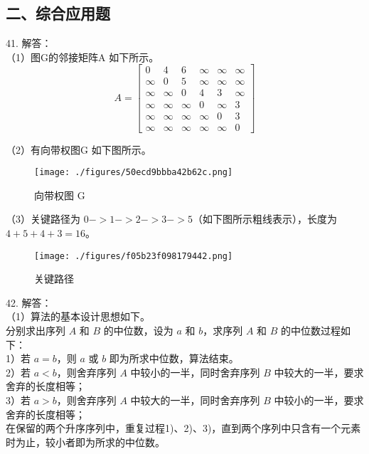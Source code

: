\subsection{二、综合应用题}

41. 解答： \\
（1）图G的邻接矩阵A 如下所示。 \\
\begin{equation}
A=
\begin{bmatrix}
 0 & 4 & 6 & \infty & \infty & \infty \\
 \infty & 0 & 5 & \infty & \infty & \infty \\
 \infty & \infty & 0 & 4 & 3 & \infty \\
 \infty & \infty & \infty & 0 & \infty & 3 \\
 \infty & \infty & \infty & \infty & 0 & 3 \\
 \infty & \infty & \infty & \infty & \infty & 0 
\end{bmatrix}
\end{equation}


（2）有向带权图G 如下图所示。 \\
\begin{figure}[ht]
\centering
\texttt{[image: ./figures/50ecd9bbba42b62c.png]}
\caption{向带权图 G} \label{fig_Na11_2}
\end{figure}

（3）关键路径为 $0->1->2->3->5$（如下图所示粗线表示），长度为 $4+5+4+3=16$。 \\
\begin{figure}[ht]
\centering
\texttt{[image: ./figures/f05b23f098179442.png]}
\caption{关键路径} \label{fig_Na11_3}
\end{figure}

42. 解答： \\
（1）算法的基本设计思想如下。 \\
分别求出序列 $A$ 和 $B$ 的中位数，设为 $a$ 和 $b$，求序列 $A$ 和 $B$ 的中位数过程如下： \\
1）若 $a=b$，则 $a$ 或 $b$ 即为所求中位数，算法结束。 \\
2）若 $a<b$，则舍弃序列 $A$ 中较小的一半，同时舍弃序列 $B$ 中较大的一半，要求舍弃的长度相等； \\
3）若 $a>b$，则舍弃序列 $A$ 中较大的一半，同时舍弃序列 $B$ 中较小的一半，要求舍弃的长度相等； \\
在保留的两个升序序列中，重复过程1)、2)、3)，直到两个序列中只含有一个元素时为止，较小者即为所求的中位数。

